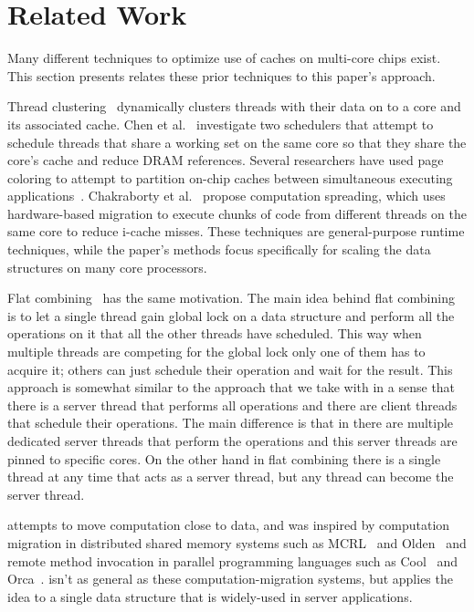 \section{Related Work}
\label{sec:related}

Many different techniques to optimize use of caches on multi-core chips exist.
This section presents relates these prior techniques to this paper's approach.

Thread clustering~\cite{tam:threadclustering} dynamically clusters threads with
their data on to a core and its associated cache. Chen et al.~\cite{chen-07}
investigate two schedulers that attempt to schedule threads that share a working
set on the same core so that they share the core's cache and reduce DRAM
references.  Several researchers have used page coloring to attempt to partition
on-chip caches between simultaneous executing
applications~\cite{cho:micro,tam:sharedl2,lin:partitionl2,soares:pollute,zhang:pagecolor}.
Chakraborty et al.~\cite{koushik:csp} propose computation spreading, which uses
hardware-based migration to execute chunks of code from different threads on the
same core to reduce i-cache misses.  These techniques are general-purpose
runtime techniques, while the paper's methods focus specifically for scaling the
data structures on many core processors.

Flat combining~\cite{flatcombining} has the same motivation. The main idea
behind flat combining is to let a single thread gain global lock on a data
structure and perform all the operations on it that all the other threads have
scheduled. This way when multiple threads are competing for the global lock only
one of them has to acquire it; others can just schedule their operation and wait
for the result. This approach is somewhat similar to the approach that we take
with \cphash{} in a sense that there is a server thread that performs all
operations and there are client threads that schedule their operations. The main
difference is that in \cphash{} there are multiple dedicated server threads that
perform the operations and this server threads are pinned to specific cores.  On
the other hand in flat combining there is a single thread at any time that acts
as a server thread, but any thread can become the server thread.

\cphash{} attempts to move computation close to data, and was inspired by
computation migration in distributed shared memory systems such as
MCRL~\cite{hsieh:sc} and Olden~\cite{olden} and remote method invocation in
parallel programming languages such as Cool~\cite{COOL} and
Orca~\cite{orca:tocs}.  \cphash{} isn't as general as these
computation-migration systems, but applies the idea to a single data structure
that is widely-used in server applications.

